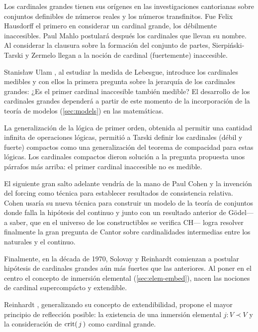 Los cardinales grandes tienen sus orígenes en las investigaciones cantorianas
sobre conjuntos definibles de números reales y los números transfinitos.
Fue Felix Hausdorff \autocite{hausdorff_grundzuge_nodate}
el primero en considerar un cardinal grande,
los débilmente inaccesibles.
Paul Mahlo \autocite{mahlo_uber_1911,mahlo_zur_1912,mahlo_zur_1913}
postulará después los cardinales que llevan su nombre.
Al considerar la clausura sobre la formación del conjunto de partes,
Sierpiński-Tarski \autocite{sierpinski_sur_1930} y  Zermelo \autocite{zermelo_uber_1930}
llegan a la noción de cardinal (fuertemente) inaccesible.

Stanisław Ulam \autocite{ulam_zur_1930}, al estudiar la medida de Lebesgue,
introduce los cardinales medibles y con ellos la primera
pregunta sobre la jerarquía de los cardinales grandes:
¿Es el primer cardinal inaccesible también medible?
El desarrollo de los cardinales grandes dependerá a partir de este
momento de la incorporación de la teoría de modelos (\cref{sec:models}) en las matemáticas.

La generalización de la lógica de primer orden, obtenida al
permitir una cantidad infinita de operaciones lógicas,
permitió a Tarski \autocite{tarski_problems_1966} definir los cardinales (débil y fuerte)
compactos como una generalización del teorema de compacidad
para estas lógicas. Los cardinales compactos dieron solución
a la pregunta propuesta unos párrafos más arriba:
el primer cardinal inaccesible no es medible.

El siguiente gran salto adelante vendría de la mano de
Paul Cohen \autocite{cohen_independence_1963,cohen_independence_1964}
y la invención del forcing como técnica
para establecer resultados de consistencia relativa.
Cohen usaría su nueva técnica para construir un modelo de la
teoría de conjuntos donde falla la hipótesis del continuo
y junto con un resultado anterior de Gödel---a saber, que
en el universo de los constructibles se verifica CH---%
logra resolver finalmente la gran pregunta de Cantor sobre cardinalidades
intermedias entre los naturales y el continuo.

Finalmente, en la década de 1970,
Solovay y Reinhardt comienzan a postular
hipótesis de cardinales grandes aún más fuertes
que las anteriores.
Al poner en el centro el concepto de inmersión elemental
(\cref{sec:elem-embed}),
nacen las nociones de cardinal supercompácto y extendible.

Reinhardt \autocite{reinhardt_ackermanns_1970},
generalizando su concepto de extendibilidad,
propone el mayor principio de reflección posible:
la existencia de una inmersión elemental $j\colon V\prec V$
y la consideración de $\operatorname{crit} (\, j\, )$ como cardinal grande.

